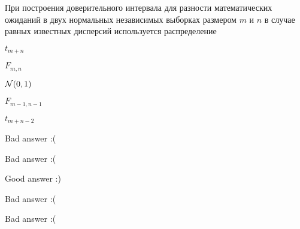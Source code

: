 
\begin{question}
При построения доверительного интервала для разности математических
ожиданий в двух нормальных независимых выборках размером \(m\) и \(n\) в
случае равных известных дисперсий используется распределение
\begin{answerlist}
  \item \(t_{m+n}\)
  \item \(F_{m,n}\)
  \item \(\mathcal{N}(0, 1)\)
  \item \(F_{m-1, n-1}\)
  \item \(t_{m+n-2}\)
\end{answerlist}
\end{question}

\begin{solution}
\begin{answerlist}
  \item Bad answer :(
  \item Bad answer :(
  \item Good answer :)
  \item Bad answer :(
  \item Bad answer :(
\end{answerlist}
\end{solution}

